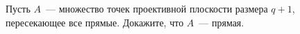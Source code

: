 Пусть $A$~--- множество точек проективной плоскости размера $q + 1$, пересекающее все прямые. Докажите, что $A$~--- прямая.
